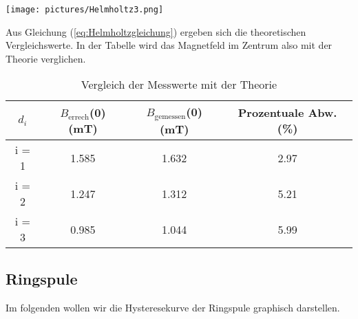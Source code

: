   \texttt{[image: pictures/Helmholtz3.png]}    %

  Aus Gleichung (\ref{eq:Helmholtzgleichung}) ergeben sich die theoretischen Vergleichswerte.
  In der Tabelle wird das Magnetfeld im Zentrum also mit der Theorie verglichen.

  \begin{table}
    \centering
    \caption{Vergleich der Messwerte mit der Theorie}
    \begin{tabular}{c c c c }
      \toprule
      $d_{i}$ & $B_{\text{errech}}$(0) (mT) &  $B_{\text{gemessen}}$(0) (mT) & Prozentuale Abw. (\%)\\
      \midrule
      i = 1  & 1.585 &         1.632  &     2.97 \\ 
      i = 2  & 1.247 &         1.312  &     5.21 \\ 
      i = 3  & 0.985 &         1.044  &     5.99 \\ 
      \bottomrule
    \end{tabular}
  \end{table}

\subsection{Ringspule}

Im folgenden wollen wir die Hysteresekurve der Ringspule graphisch darstellen.

